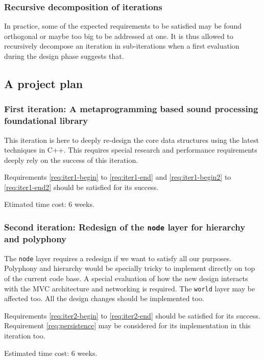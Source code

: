 \subsubsection{Recursive decomposition of iterations}

In practice, some of the expected requirements to be satisfied may be
found orthogonal or maybe too big to be addressed at one. It is thus
allowed to recursively decompose an iteration in sub-iterations when a
first evaluation during the design phase suggests that.

\subsection{A project plan}

\subsubsection{First iteration: A metaprogramming based sound
  processing foundational library}

This iteration is here to deeply re-design the core data structures
using the latest techniques in C++. This requires special research and
performance requirements deeply rely on the success of this
iteration. 

Requirements \ref{req:iter1-begin} to \ref{req:iter1-end} and
\ref{req:iter1-begin2} to \ref{req:iter1-end2} should be satisfied for
its success.

Etimated time cost: 6 weeks.

\subsubsection{Second iteration: Redesign of the \texttt{node} layer
  for hierarchy and polyphony}

The \texttt{node} layer requires a redesign if we want to satisfy all
our purposes. Polyphony and hierarchy would be specially tricky to
implement directly on top of the current code base. A special
evaluation of how the new design interacts with the MVC architecture
and networking is required. The \texttt{world} layer may be affected
too. All the design changes should be implemented too.

Requirements \ref{req:iter2-begin} to \ref{req:iter2-end} should be
satisfied for its success. Requirement \ref{req:persistence} may be
considered for its implementation in this iteration too.

Estimated time cost: 6 weeks.

